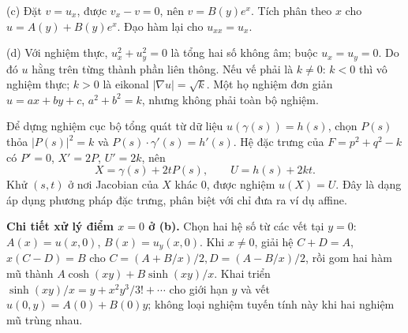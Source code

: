 (c) Đặt $v=u_x$, được $v_x-v=0$, nên $v=B(y)e^x$. Tích phân theo $x$ cho $u=A(y)+B(y)e^x$. Đạo hàm lại cho $u_{xx}=u_x$.

(d) Với nghiệm thực, $u_x^2+u_y^2=0$ là tổng hai số không âm; buộc $u_x=u_y=0$. Do đó $u$ hằng trên từng thành phần liên thông. Nếu vế phải là $k\ne0$: $k<0$ thì vô nghiệm thực; $k>0$ là eikonal $|\nabla u|=\sqrt k$. Một họ nghiệm đơn giản $u=ax+by+c$, $a^2+b^2=k$, nhưng không phải toàn bộ nghiệm.

Để dựng nghiệm cục bộ tổng quát từ dữ liệu $u(\gamma(s))=h(s)$, chọn $P(s)$ thỏa $|P(s)|^2=k$ và $P(s)\cdot\gamma'(s)=h'(s)$. Hệ đặc trưng của $F=p^2+q^2-k$ có $P'=0$, $X'=2P$, $U'=2k$, nên
\[X=\gamma(s)+2tP(s),\qquad U=h(s)+2kt.\]
Khử $(s,t)$ ở nơi Jacobian của $X$ khác 0, được nghiệm $u(X)=U$. Đây là dạng áp dụng phương pháp đặc trưng, phân biệt với chỉ đưa ra ví dụ affine.

\textbf{Chi tiết xử lý điểm $x=0$ ở (b).} Chọn hai hệ số từ các vết tại $y=0$: $A(x)=u(x,0)$, $B(x)=u_y(x,0)$. Khi $x\ne0$, giải hệ $C+D=A$, $x(C-D)=B$ cho $C=(A+B/x)/2,D=(A-B/x)/2$, rồi gom hai hàm mũ thành $A\cosh(xy)+B\sinh(xy)/x$. Khai triển $\sinh(xy)/x=y+x^2y^3/3!+\cdots$ cho giới hạn $y$ và vết $u(0,y)=A(0)+B(0)y$; không loại nghiệm tuyến tính này khi hai nghiệm mũ trùng nhau.
